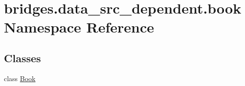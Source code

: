 \hypertarget{namespacebridges_1_1data__src__dependent_1_1book}{}\section{bridges.\+data\+\_\+src\+\_\+dependent.\+book Namespace Reference}
\label{namespacebridges_1_1data__src__dependent_1_1book}
\subsection*{Classes}
\begin{DoxyCompactItemize}
\item 
class \hyperlink{classbridges_1_1data__src__dependent_1_1book_1_1_book}{Book}
\end{DoxyCompactItemize}
